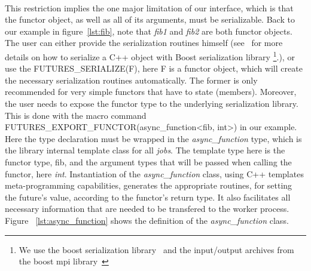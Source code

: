 \paragraph{}
This restriction
implies the one major limitation of our interface, which is that the functor object, as well as all of its arguments,
must be serializable.  Back to our example in figure~\ref{lst:fib}, note that \emph{fib1} and \emph{fib2} are both
functor objects.  The user can either provide the serialization routines himself (see~\cite{Ramey:2004:Boost:Serialization} 
for more details on how to serialize a C++ object with Boost serialization library
\footnote{We use the boost serialization library~\cite{Ramey:2004:Boost:Serialization} 
and the input/output archives from the boost mpi library~\cite{Gregor:2005:Boost:MPI}}.), or use the FUTURES\_SERIALIZE(F),
here F is a functor object, which will create the necessary serialization routines automatically.  The former is only 
recommended for very simple functors that have to state (members).  Moreover, the user needs to expose the functor 
type to the underlying serialization library.  This is done with the macro command 
FUTURES\_EXPORT\_FUNCTOR(async\_function<fib, int>) in our example.  Here the type declaration must be wrapped in the
\emph{async\_function} type, which is the library internal template class for all \emph{jobs}.  The template type 
here is the functor type, fib, and the argument types that will be passed when calling the functor, here \emph{int}. 
Instantiation of the \emph{async\_function} class, using C++ templates meta-programming capabilities,
generates the appropriate routines, for setting the future's value, according to the functor's return type.
It also facilitates all necessary information that are needed to be transfered to the worker process.
Figure ~\ref{lst:async_function} shows the definition of the \emph{async\_function} class.

